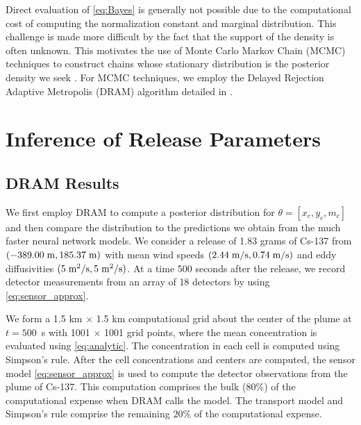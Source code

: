 \documentclass[sn-mathphys-ay]{sn-jnl}
\begin{document}
Direct evaluation of \eqref{eq:Bayes} is generally not possible due to the computational cost of computing the normalization constant and marginal distribution. This challenge is made more difficult by the fact that the support of the density is often unknown. This motivates the use of Monte Carlo Markov Chain (MCMC) techniques to construct chains whose stationary distribution is the posterior density we seek \citep{Smith2013Uncertainty}. For MCMC techniques, we employ the Delayed Rejection Adaptive Metropolis (DRAM) algorithm detailed in \citep{kaipio2006,Smith2013Uncertainty}.

\section{Inference of Release Parameters}
\label{sec:chap3_dram_results}
\subsection{DRAM Results}
\label{sec:DRAM_results}
We first employ DRAM to compute a posterior distribution for $\theta=[x_c,y_c,m_c]$ and then compare the distribution to the predictions we obtain from the much faster neural network models. We consider a release of 1.83 grams of Cs-137 from $(-389.00 \hspace{1mm} \text{m}, 185.37 \hspace{1mm} \text{m})$ with mean wind speeds $(2.44 \hspace{1mm} \text{m/s},0.74 \hspace{1mm} \text{m/s})$ and eddy diffusivities $(5 \hspace{1mm} \text{m$^2$/s}, 5 \hspace{1mm} \text{m$^2$/s})$. At a time 500 seconds after the release, we record detector measurements from an array of 18 detectors by using \eqref{eq:sensor_approx}.

We form a 1.5 km $\times$ 1.5 km computational grid about the center of the plume at $t=500$~s with 1001 $\times$ 1001 grid points, where the mean concentration is evaluated using \eqref{eq:analytic}. The concentration in each cell is computed using Simpson's rule. After the cell concentrations and centers are computed, the sensor model \eqref{eq:sensor_approx} is used to compute the detector observations from the plume of Cs-137. This computation comprises the bulk ($80\%$) of the computational expense when DRAM calls the model. The transport model and Simpson's rule comprise the remaining $20\%$ of the computational expense.
\end{document}
